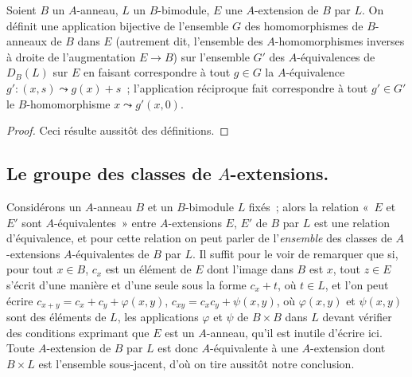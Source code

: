 \begin{proposition}[18.2.10]
\label{0.18.2.10-fr}
Soient $B$ un $A$-anneau, $L$ un $B$-bimodule, $E$ une $A$-extension de $B$
par $L$. On définit une application bijective de l'ensemble $G$ des
homomorphismes de $B$-anneaux de $B$ dans $E$ \textup{(autrement dit, l'ensemble des
$A$-homomorphismes inverses à droite de l'augmentation $E\to B$)} sur
l'ensemble $G'$ des $A$-équivalences de $D_B(L)$ sur $E$ en faisant
correspondre à tout $g\in G$ la $A$-équivalence
$g':(x,s)\leadsto g(x)+s$~; l'application réciproque fait correspondre à tout
$g'\in G'$ le $B$-homomorphisme $x\leadsto g'(x,0)$.
\end{proposition}

\begin{proof}
Ceci résulte aussitôt des définitions.
\end{proof}

\subsection{Le groupe des classes de $A$-extensions.}
\label{subsection:0.18.3-fr}

\begin{env}[18.3.1]
\label{0.18.3.1-fr}
Considérons un $A$-anneau $B$ et un $B$-bimodule $L$ fixés~; alors la relation
«~$E$ et $E'$ sont $A$-équivalentes~» entre $A$-extensions $E$, $E'$ de $B$
par $L$ est une relation d'équivalence, et pour cette relation on peut parler
de l'\emph{ensemble} des classes de $A$-extensions $A$-équivalentes de $B$ par
$L$. Il suffit pour le voir de remarquer que si, pour tout $x\in B$, $c_x$ est
un élément de $E$ dont l'image dans $B$ est $x$, tout $z\in E$ s'écrit d'une
manière et d'une seule sous la forme $c_x+t$, où $t\in L$, et l'on peut écrire
$c_{x+y}=c_x+c_y+\varphi(x,y)$,
$c_{xy}=c_xc_y+\psi(x,y)$, où $\varphi(x,y)$ et $\psi(x,y)$ sont des éléments de $L$, les applications
$\varphi$ et $\psi$ de $B\times B$ dans $L$ devant vérifier des conditions
exprimant que $E$ est un $A$-anneau, qu'il est inutile d'écrire ici. Toute
$A$-extension de $B$ par $L$ est donc $A$-équivalente à une $A$-extension dont
$B\times L$ est l'ensemble sous-jacent, d'où on tire aussitôt notre conclusion.
\end{env}

